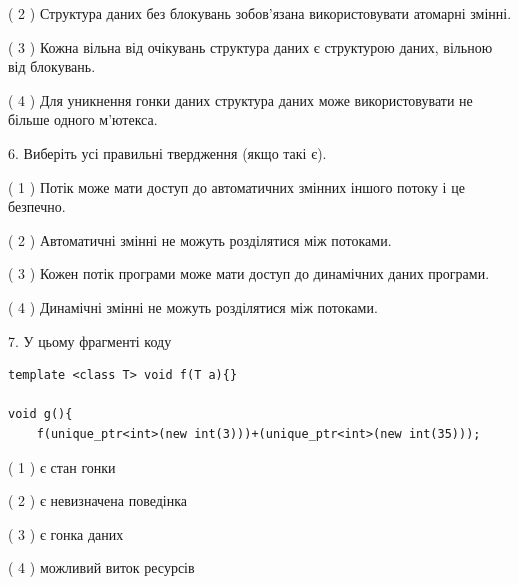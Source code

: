 \documentclass[12pt, ukrainian]{article}
\begin{document}
\begin {large}
{( 2 ) Структура даних без блокувань зобов’язана використовувати атомарні змінні.%

( 3 ) Кожна вільна від очікувань структура даних є структурою даних, вільною від блокувань.%

( 4 ) Для уникнення гонки даних структура даних може використовувати не більше одного м’ютекса.%
\newpage



\vspace{5mm}
6. Виберіть усі правильні твердження (якщо такі є).\par
\vspace{2mm}

( 1 ) Потік може мати доступ до автоматичних змінних іншого потоку і це безпечно.%

( 2 ) Автоматичні змінні не можуть розділятися між потоками.%

( 3 ) Кожен потік програми може мати доступ до динамічних даних програми.%

( 4 ) Динамічні змінні не можуть розділятися між потоками.%


\vspace{5mm}
7. У цьому фрагменті коду
\begin{verbatim}
template <class T> void f(T a){}

void g(){
    f(unique_ptr<int>(new int(3)))+(unique_ptr<int>(new int(35)));
\end{verbatim}

( 1 ) є стан гонки%

( 2 ) є невизначена поведінка%

( 3 ) є гонка даних%

( 4 ) можливий виток ресурсів%
}
\end {large}
\end{document}
